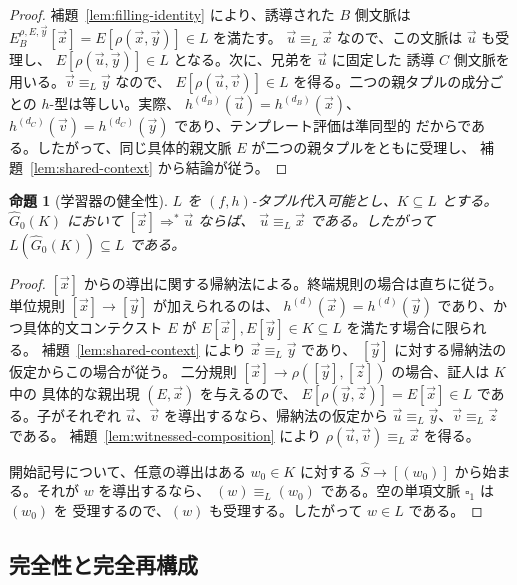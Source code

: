 \documentclass[11pt,a4paper]{ltjsarticle}
\newtheorem{proposition}[theorem]{命題}
\theoremstyle{remark}
\newcommand{\tuple}[1]{\vec{#1}}
\newcommand{\blank}{\square}
\begin{document}
\begin{proof}
補題~\ref{lem:filling-identity} により、誘導された \(B\) 側文脈は
\(E_B^{\rho,E,\tuple y}[\tuple x]=E[\rho(\tuple x,\tuple y)]\in L\) を満たす。
\(\tuple u\equiv_L\tuple x\) なので、この文脈は \(\tuple u\) も受理し、
\(E[\rho(\tuple u,\tuple y)]\in L\) となる。次に、兄弟を \(\tuple u\) に固定した
誘導 \(C\) 側文脈を用いる。\(\tuple v\equiv_L\tuple y\) なので、
\(E[\rho(\tuple u,\tuple v)]\in L\) を得る。二つの親タプルの成分ごとの
\(h\)-型は等しい。実際、
\(h^{(d_B)}(\tuple u)=h^{(d_B)}(\tuple x)\)、
\(h^{(d_C)}(\tuple v)=h^{(d_C)}(\tuple y)\) であり、テンプレート評価は準同型的
だからである。したがって、同じ具体的親文脈 \(E\) が二つの親タプルをともに受理し、
補題~\ref{lem:shared-context} から結論が従う。
\end{proof}

\begin{proposition}[学習器の健全性]
\label{prop:learner-soundness}
\(L\) を \((f,h)\)-タプル代入可能とし、\(K\subseteq L\) とする。
\(\widehat G_0(K)\) において \([\tuple x]\Rightarrow^*\tuple u\) ならば、
\(\tuple u\equiv_L\tuple x\) である。したがって
\(L(\widehat G_0(K))\subseteq L\) である。
\end{proposition}

\begin{proof}
\([\tuple x]\) からの導出に関する帰納法による。終端規則の場合は直ちに従う。
単位規則 \([\tuple x]\to[\tuple y]\) が加えられるのは、
\(h^{(d)}(\tuple x)=h^{(d)}(\tuple y)\) であり、かつ具体的文コンテクスト \(E\) が
\(E[\tuple x],E[\tuple y]\in K\subseteq L\) を満たす場合に限られる。
補題~\ref{lem:shared-context} により \(\tuple x\equiv_L\tuple y\) であり、
\([\tuple y]\) に対する帰納法の仮定からこの場合が従う。
二分規則 \([\tuple x]\to\rho([\tuple y],[\tuple z])\) の場合、証人は \(K\) 中の
具体的な親出現 \((E,\tuple x)\) を与えるので、
\(E[\rho(\tuple y,\tuple z)]=E[\tuple x]\in L\) である。子がそれぞれ
\(\tuple u\)、\(\tuple v\) を導出するなら、帰納法の仮定から
\(\tuple u\equiv_L\tuple y\)、\(\tuple v\equiv_L\tuple z\) である。
補題~\ref{lem:witnessed-composition} により
\(\rho(\tuple u,\tuple v)\equiv_L\tuple x\) を得る。

開始記号について、任意の導出はある \(w_0\in K\) に対する
\(\widehat S\to[(w_0)]\) から始まる。それが \(w\) を導出するなら、
\((w)\equiv_L(w_0)\) である。空の単項文脈 \(\blank_1\) は \((w_0)\) を
受理するので、\((w)\) も受理する。したがって \(w\in L\) である。
\end{proof}

\subsection{完全性と完全再構成}
\label{sec:completeness}
\end{document}
